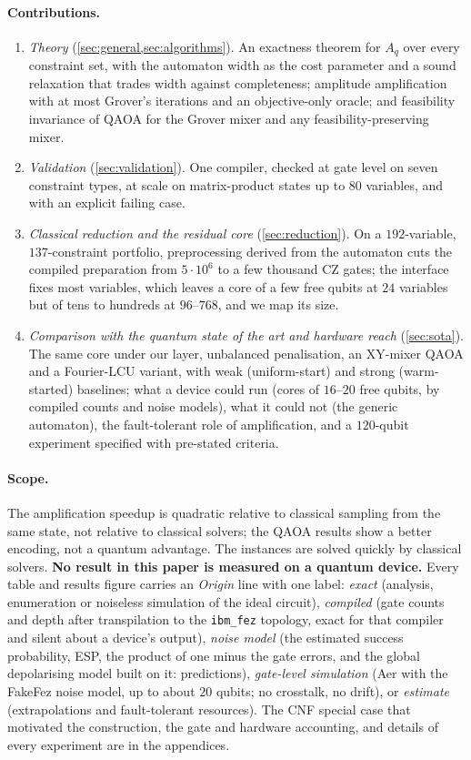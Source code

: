 \documentclass[10pt,twocolumn]{article}
\begin{document}
\paragraph{Contributions.}
\begin{enumerate}\itemsep0pt
\item \emph{Theory} (\cref{sec:general,sec:algorithms}). An exactness theorem for $A_q$ over every constraint set, with the automaton width as the cost parameter and a sound relaxation that trades width against completeness; amplitude amplification with at most Grover's iterations and an objective-only oracle; and feasibility invariance of QAOA for the Grover mixer and any feasibility-preserving mixer.
\item \emph{Validation} (\cref{sec:validation}). One compiler, checked at gate level on seven constraint types, at scale on matrix-product states up to $80$ variables, and with an explicit failing case.
\item \emph{Classical reduction and the residual core} (\cref{sec:reduction}). On a $192$-variable, $137$-constraint portfolio, preprocessing derived from the automaton cuts the compiled preparation from $5\cdot10^6$ to a few thousand CZ gates; the interface fixes most variables, which leaves a core of a few free qubits at $24$ variables but of tens to hundreds at $96$--$768$, and we map its size.
\item \emph{Comparison with the quantum state of the art and hardware reach} (\cref{sec:sota}). The same core under our layer, unbalanced penalisation, an XY-mixer QAOA and a Fourier-LCU variant, with weak (uniform-start) and strong (warm-started) baselines; what a device could run (cores of $16$--$20$ free qubits, by compiled counts and noise models), what it could not (the generic automaton), the fault-tolerant role of amplification, and a $120$-qubit experiment specified with pre-stated criteria.
\end{enumerate}

\paragraph{Scope.} The amplification speedup is quadratic relative to classical sampling from the same state, not relative to classical solvers; the QAOA results show a better encoding, not a quantum advantage. The instances are solved quickly by classical solvers. \textbf{No result in this paper is measured on a quantum device.} Every table and results figure carries an \emph{Origin} line with one label: \emph{exact} (analysis, enumeration or noiseless simulation of the ideal circuit), \emph{compiled} (gate counts and depth after transpilation to the \texttt{ibm\_fez} topology, exact for that compiler and silent about a device's output), \emph{noise model} (the estimated success probability, ESP, the product of one minus the gate errors, and the global depolarising model built on it: predictions), \emph{gate-level simulation} (Aer with the FakeFez noise model, up to about $20$ qubits; no crosstalk, no drift), or \emph{estimate} (extrapolations and fault-tolerant resources). The CNF special case that motivated the construction, the gate and hardware accounting, and details of every experiment are in the appendices.
\end{document}
